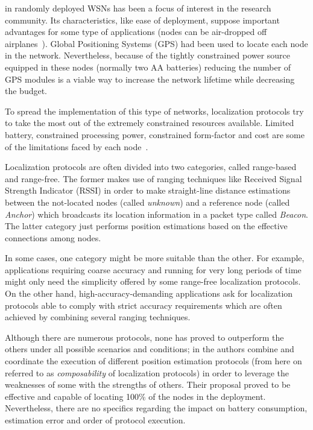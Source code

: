  in randomly deployed WSNs has been a focus of interest in the research community. Its characteristics, like ease of deployment, suppose important advantages for some type of applications (nodes can be air-dropped off airplanes~\cite{airDroppedVolvano}). Global Positioning Systems (GPS) had been used to locate each node in the network. Nevertheless, because of the tightly constrained power source equipped in these nodes (normally two AA batteries) reducing the number of GPS modules is a viable way to increase the network lifetime while decreasing the budget.

To spread the implementation of this type of networks, localization protocols try to take the most out of the extremely constrained resources available. Limited battery, constrained processing power, constrained form-factor and cost are some of the limitations faced by each node~\cite{AkyildizWSNs}.

Localization protocols are often divided into two categories, called range-based and range-free. The former makes use of ranging techniques like Received Signal Strength Indicator (RSSI) in order to make straight-line distance estimations between the not-located nodes (called \emph{unknown}) and a reference node (called \emph{Anchor}) which broadcasts its location information in a packet type called \emph{Beacon}. The latter category just performs position estimations based on the effective connections among nodes. 

In some cases, one category might be more suitable than the other. For example, applications requiring coarse accuracy and running for very long periods of time might only need the simplicity offered by some range-free localization protocols. On the other hand, high-accuracy-demanding applications ask for localization protocols able to comply with strict accuracy requirements which are often achieved by combining several ranging techniques.

Although there are numerous protocols, none has proved to outperform the others under all possible scenarios and conditions; in \cite{composability} the authors combine and coordinate the execution of different position estimation protocols (from here on referred to as \emph{composability} of localization protocols) in order to leverage the weaknesses of some with the strengths of others. Their proposal proved to be effective and capable of locating 100\% of the nodes in the deployment. Nevertheless, there are no specifics regarding the impact on battery consumption, estimation error and order of protocol execution.

